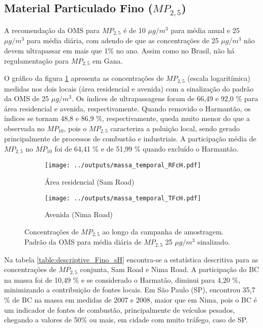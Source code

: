 \newpage
\subsection{Material Particulado Fino ($MP_{2,5}$)}

A recomendação da OMS para $MP_{2,5}$ é de 10 $\mu g/m^3$ para média anual e 
25 $\mu g/m^3$ para média diária, com adendo de que as concentrações de 
25 $\mu g/m^3$ não devem ultrapassar em mais que 1\% no ano. Assim como no
Brasil, não há regulamentação para $MP_{2,5}$ em Gana. 

O gráfico da figura \ref{fig:massa_temporal_mp2.5} apresenta as concentrações
de $MP_{2,5}$ (escala logaritímica) medidas nos dois locais 
(área residencial e avenida) com a sinalização do padrão da OMS de 
25 $\mu g/m^3$. Os índices de ultrapassagens foram de 66,49 e 92,0 \% 
para área residencial e avenida, respectivamente. Quando removido o Harmantão, 
os índices se tornam 48,8 e 86,9 \%, respectivamente, queda muito menor do 
que a observada no $MP_{10}$, pois o $MP_{2,5}$ caracteriza a poluição local, 
sendo gerado principalmente de processos de combustão e industriais.
A participação média de $MP_{2,5}$ no $MP_{10}$ foi de 64,41 \% e de 
51,99 \% quando excluído o Harmantão.

\begin{figure}[H]
  \centering
  \begin{subfigure}[b]{0.45\textwidth}
    \texttt{[image: ../outputs/massa\_temporal\_RFcH.pdf]}
    \caption{Área residencial (Sam Road)}
  \end{subfigure}%
  \begin{subfigure}[b]{0.45\textwidth}
    \texttt{[image: ../outputs/massa\_temporal\_TFcH.pdf]}
    \caption{Avenida (Nima Road)}
  \end{subfigure}
  \caption{Concentrações de $MP_{2,5}$ ao longo da campanha de amostragem. 
           Padrão da OMS para média diária de $MP_{2,5}$ 25 $\mu g/m^3$ sinalizado.
           \label{fig:massa_temporal_mp2.5}}
\end{figure}

Na tabela \ref{table:descriptive_Fino_sH} encontra-se a estatística 
descritiva para as concentrações de $MP_{2,5}$ conjunta, Sam Road e Nima Road. 
A participação do BC na massa foi de 10,49 \% e se considerado 
o Harmatão, diminui para 4,20 \%, minimizando a contribuição de fontes locais.
Em São Paulo (SP), \citet{andrade2012} encontrou 35,7 \% de BC na massa em medidas
de 2007 e 2008, maior que em Nima, pois o BC é um indicador de fontes de 
combustão, principalmente de veículos pesados, chegando a valores de 50\% ou 
mais, em cidade com muito tráfego, caso de SP.

